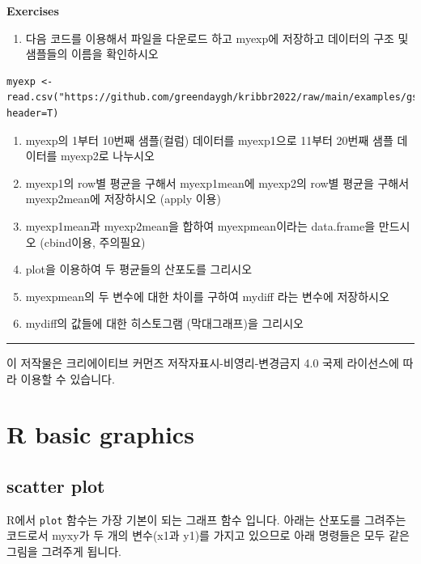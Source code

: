 \documentclass[
]{book}
\providecommand{\tightlist}{%
  \setlength{\itemsep}{0pt}\setlength{\parskip}{0pt}}
\begin{document}
\textbf{Exercises}

\begin{enumerate}
\def\labelenumi{\arabic{enumi}.}
\tightlist
\item
  다음 코드를 이용해서 파일을 다운로드 하고 myexp에 저장하고 데이터의 구조 및 샘플들의 이름을 확인하시오
\end{enumerate}

\begin{verbatim}
myexp <- read.csv("https://github.com/greendaygh/kribbr2022/raw/main/examples/gse93819_expression_values.csv", header=T)
\end{verbatim}

\begin{enumerate}
\def\labelenumi{\arabic{enumi}.}
\setcounter{enumi}{1}
\item
  myexp의 1부터 10번째 샘플(컬럼) 데이터를 myexp1으로 11부터 20번째 샘플 데이터를 myexp2로 나누시오
\item
  myexp1의 row별 평균을 구해서 myexp1mean에 myexp2의 row별 평균을 구해서 myexp2mean에 저장하시오 (apply 이용)
\item
  myexp1mean과 myexp2mean을 합하여 myexpmean이라는 data.frame을 만드시오 (cbind이용, 주의필요)
\item
  plot을 이용하여 두 평균들의 산포도를 그리시오
\item
  myexpmean의 두 변수에 대한 차이를 구하여 mydiff 라는 변수에 저장하시오
\item
  mydiff의 값들에 대한 히스토그램 (막대그래프)을 그리시오
\end{enumerate}

\begin{center}\rule{0.5\linewidth}{0.5pt}\end{center}

이 저작물은 크리에이티브 커먼즈 저작자표시-비영리-변경금지 4.0 국제 라이선스에 따라 이용할 수 있습니다.

\hypertarget{r-basic-graphics}{%
\chapter{R basic graphics}\label{r-basic-graphics}}

\hypertarget{scatter-plot}{%
\section{scatter plot}\label{scatter-plot}}

R에서 \texttt{plot} 함수는 가장 기본이 되는 그래프 함수 입니다. 아래는 산포도를 그려주는 코드로서 myxy가 두 개의 변수(x1과 y1)를 가지고 있으므로 아래 명령들은 모두 같은 그림을 그려주게 됩니다.
\end{document}
